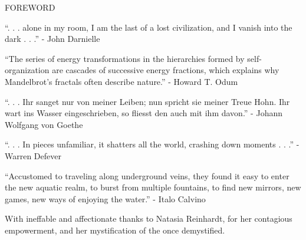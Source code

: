 \documentclass[11pt]{article}
\begin{document}
\begingroup
\begin{center}
\huge FOREWORD
\end{center}
\endgroup

\vspace*{2\baselineskip}

\begingroup
\begin{center}
``. . . alone in my room, I am the last of a lost civilization, and I vanish into the dark . . .''
\rightskip\leftskip
\phantom{text} \hfill - John Darnielle
\end{center}
\endgroup

\vspace*{4\baselineskip}

\begingroup
\begin{center}
``The series of energy transformations in the hierarchies formed by self-organization are cascades of successive energy fractions, which explains why Mandelbrot's fractals often describe nature.''
\rightskip\leftskip
\phantom{text} \hfill - Howard T. Odum
\end{center}
\endgroup

\vspace*{4\baselineskip}

\begingroup
\begin{center}
``. . . Ihr sanget nur von meiner Leiben; nun spricht sie meiner Treue Hohn. Ihr wart ins Wasser eingeschrieben, so fliesst den auch mit ihm davon.''
\rightskip\leftskip
\phantom{text} \hfill - Johann Wolfgang von Goethe
\end{center}
\endgroup

\vspace*{4\baselineskip}

\begingroup
\begin{center}
``. . . In pieces unfamiliar, it shatters all the world, crashing down moments . . .''
\rightskip\leftskip
\phantom{text} \hfill - Warren Defever
\end{center}
\endgroup

\vspace*{4\baselineskip}

\begingroup
\begin{center}
``Accustomed to traveling along underground veins, they found it easy to enter the new aquatic realm, to burst from multiple fountains, to find new mirrors, new games, new ways of enjoying the water.''
\rightskip\leftskip
\phantom{text} \hfill - Italo Calvino
\end{center}
\endgroup

\vspace*{16\baselineskip}

\begingroup
\begin{center}
With ineffable and affectionate thanks to Natasia Reinhardt, for her contagious empowerment, and her mystification of the once demystified.
\end{center}
\endgroup
\end{document}
